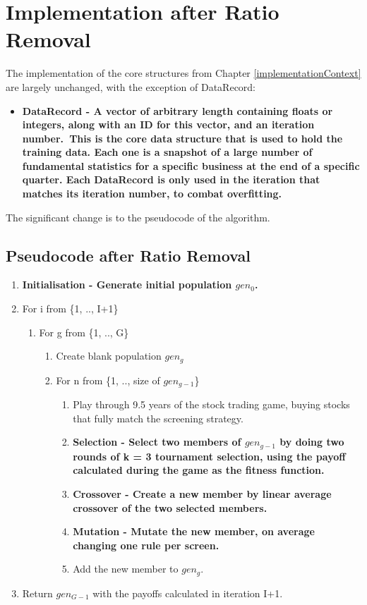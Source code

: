 \section{Implementation after Ratio Removal}
The implementation of the core structures from Chapter \ref{implementationContext} are largely unchanged, with the exception of DataRecord:
\begin{itemize}
    \item \bf DataRecord \rm - A vector of arbitrary length containing floats or integers, along with an ID for this vector, \bf and an iteration number.\rm \ This is the core data structure that is used to hold the training data. Each one is a snapshot of a large number of fundamental statistics for a specific business at the end of a specific quarter. \bf Each DataRecord is only used in the iteration that matches its iteration number, to combat overfitting.\rm
\end{itemize}

The significant change is to the pseudocode of the algorithm.

\subsection{Pseudocode after Ratio Removal}

\begin{enumerate}
    \item \bf Initialisation \rm - Generate initial population $gen_{0}$.
    \item For i from \{1, .., I+1\}
    \begin{enumerate}
        \item For g from \{1, .., G\}
        \begin{enumerate}
            \item Create blank population $gen_{g}$
            \item For n from \{1, .., size of $gen_{g-1}$\}
            \begin{enumerate}
                \item Play through 9.5 years of the stock trading game, buying stocks that fully match the screening strategy.
                \item \bf Selection \rm - Select two members of $gen_{g-1}$ by doing two rounds of k = 3 tournament selection, using the payoff calculated during the game as the fitness function.
                \item \bf Crossover \rm - Create a new member by linear average crossover of the two selected members.
                \item \bf Mutation \rm - Mutate the new member, on average changing one rule per screen.
                \item Add the new member to $gen_{g}$.
            \end{enumerate}
        \end{enumerate}
    \end{enumerate}
    \item Return $gen_{G-1}$ with the payoffs calculated in iteration I+1.
\end{enumerate}